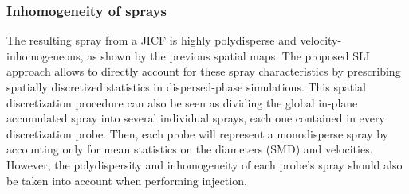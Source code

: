 \clearpage



\subsubsection*{Inhomogeneity of sprays}

The resulting spray from a JICF is highly polydisperse and velocity-inhomogeneous, as shown by the previous spatial maps. The proposed SLI approach allows to directly account for these spray characteristics by prescribing spatially discretized statistics in dispersed-phase simulations. This spatial discretization procedure can also be seen as dividing the global in-plane accumulated spray into several individual sprays, each one contained in every discretization probe. Then, each probe will represent a monodisperse spray by accounting only for mean statistics on the diameters (SMD) and velocities. However, the polydispersity and inhomogeneity of each probe's spray should also be taken into account when performing injection.

